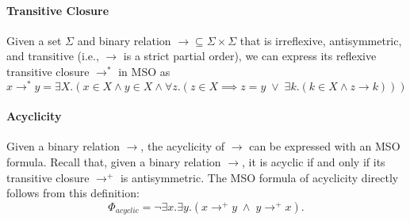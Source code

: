 \paragraph*{Transitive Closure}
Given a set $\Sigma$ and binary relation $\to \subseteq \Sigma \times \Sigma$ that is irreflexive, antisymmetric, and transitive (i.e., $\to$ is a strict partial order), we can express its reflexive transitive closure $\to^*$ in MSO as
\[
x \to^* y = \exists X.(x \in X \wedge y \in X \wedge 
\forall z.(z \in X \implies z=y \;\vee\; 
\exists k.(k \in X \wedge z \to k)))
\]

\paragraph*{Acyclicity} 

Given a binary relation $\to$, the acyclicity of $\to$ can be expressed with an MSO formula. Recall that, given a binary relation $\to$, it is acyclic if and only if its transitive closure $\to^+$ is antisymmetric. The MSO formula of acyclicity directly follows from this definition:
\[
\Phi_{acyclic} =  \neg \exists x.\exists y.(x \to^+ y \;\wedge\; y \to^+ x).   
\]